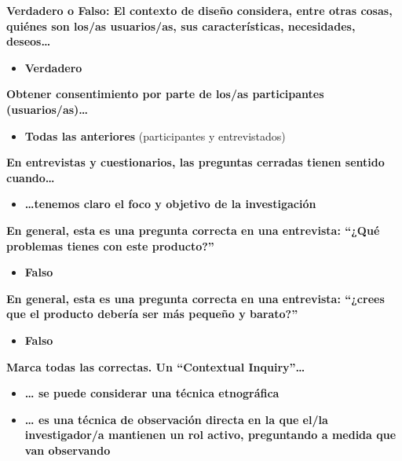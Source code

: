 \textbf{Verdadero o Falso: El contexto de diseño considera, entre otras
cosas, quiénes son los/as usuarios/as, sus características, necesidades,
deseos\ldots{}}

\begin{itemize}
\tightlist
\item
  \textbf{Verdadero}
\end{itemize}

\textbf{Obtener consentimiento por parte de los/as participantes
(usuarios/as)\ldots{}}

\begin{itemize}
\tightlist
\item
  \textbf{Todas las anteriores} (participantes y entrevistados)
\end{itemize}

\textbf{En entrevistas y cuestionarios, las preguntas cerradas tienen
sentido cuando\ldots{}}

\begin{itemize}
\tightlist
\item
  \textbf{\ldots tenemos claro el foco y objetivo de la investigación}
\end{itemize}

\textbf{En general, esta es una pregunta correcta en una entrevista:
``¿Qué problemas tienes con este producto?''}

\begin{itemize}
\tightlist
\item
  \textbf{Falso}
\end{itemize}

\textbf{En general, esta es una pregunta correcta en una entrevista:
``¿crees que el producto debería ser más pequeño y barato?''}

\begin{itemize}
\tightlist
\item
  \textbf{Falso}
\end{itemize}

\textbf{Marca todas las correctas. Un ``Contextual Inquiry''\ldots{}}

\begin{itemize}
\tightlist
\item
  \textbf{\ldots{} se puede considerar una técnica etnográfica}
\item
  \textbf{\ldots{} es una técnica de observación directa en la que el/la
  investigador/a mantienen un rol activo, preguntando a medida que van
  observando}
\end{itemize}

